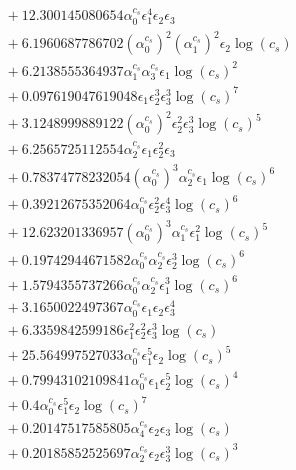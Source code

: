 \documentclass[10pt]{article}
\begin{document}
\begin{align*}
&{}  + 12.300145080654 \alpha_{0}^{c_s} \epsilon_{1}^{4} \epsilon_{2} \epsilon_{3} \\
&{}  + 6.1960687786702 \left(\alpha_{0}^{c_s}\right)^{2} \left(\alpha_{1}^{c_s}\right)^{2} \epsilon_{2} \log{\left(c_{s} \right)} \\
&{}  + 6.2138555364937 \alpha_{1}^{c_s} \alpha_{3}^{c_s} \epsilon_{1} \log{\left(c_{s} \right)}^{2} \\
&{}  + 0.097619047619048 \epsilon_{1} \epsilon_{2}^{3} \epsilon_{3}^{3} \log{\left(c_{s} \right)}^{7} \\
&{}  + 3.1248999889122 \left(\alpha_{0}^{c_s}\right)^{2} \epsilon_{2}^{2} \epsilon_{3}^{3} \log{\left(c_{s} \right)}^{5} \\
&{}  + 6.2565725112554 \alpha_{2}^{c_s} \epsilon_{1} \epsilon_{2}^{2} \epsilon_{3} \\
&{}  + 0.78374778232054 \left(\alpha_{0}^{c_s}\right)^{3} \alpha_{2}^{c_s} \epsilon_{1} \log{\left(c_{s} \right)}^{6} \\
&{}  + 0.39212675352064 \alpha_{0}^{c_s} \epsilon_{2}^{2} \epsilon_{3}^{4} \log{\left(c_{s} \right)}^{6} \\
&{}  + 12.623201336957 \left(\alpha_{0}^{c_s}\right)^{3} \alpha_{1}^{c_s} \epsilon_{1}^{2} \log{\left(c_{s} \right)}^{5} \\
&{}  + 0.19742944671582 \alpha_{0}^{c_s} \alpha_{2}^{c_s} \epsilon_{2}^{3} \log{\left(c_{s} \right)}^{6} \\
&{}  + 1.5794355737266 \alpha_{0}^{c_s} \alpha_{2}^{c_s} \epsilon_{1}^{3} \log{\left(c_{s} \right)}^{6} \\
&{}  + 3.1650022497367 \alpha_{0}^{c_s} \epsilon_{1} \epsilon_{2} \epsilon_{3}^{4} \\
&{}  + 6.3359842599186 \epsilon_{1}^{2} \epsilon_{2}^{2} \epsilon_{3}^{3} \log{\left(c_{s} \right)} \\
&{}  + 25.564997527033 \alpha_{0}^{c_s} \epsilon_{1}^{5} \epsilon_{2} \log{\left(c_{s} \right)}^{5} \\
&{}  + 0.79943102109841 \alpha_{0}^{c_s} \epsilon_{1} \epsilon_{2}^{5} \log{\left(c_{s} \right)}^{4} \\
&{}  + 0.4 \alpha_{0}^{c_s} \epsilon_{1}^{5} \epsilon_{2} \log{\left(c_{s} \right)}^{7} \\
&{}  + 0.20147517585805 \alpha_{4}^{c_s} \epsilon_{2} \epsilon_{3} \log{\left(c_{s} \right)} \\
&{}  + 0.20185852525697 \alpha_{2}^{c_s} \epsilon_{2} \epsilon_{3}^{3} \log{\left(c_{s} \right)}^{3} \\

\end{align*}
\end{document}

